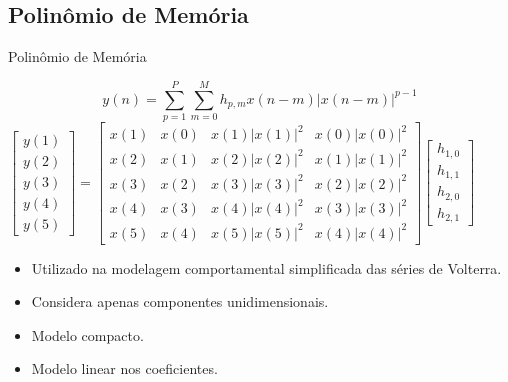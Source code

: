 \documentclass{if-beamer}
\begin{document}
\subsection{Polinômio de Memória}
\begin{frame}{Polinômio de Memória}
	\begin{minipage}{0.6\textwidth}
		\raggedleft
		\scriptsize
		\begin{equation}
			y(n) = \sum_{p=1}^{P} \sum_{m=0}^{M} h_{p,m} x(n-m) |x(n-m)|^{p-1}
		\end{equation}
			$
				\begin{bmatrix}
					y(1) \\
					y(2) \\
					y(3) \\
					y(4) \\
					y(5)
				\end{bmatrix}
				=
				\begin{bmatrix}
					x(1) & x(0) & x(1)\lvert x(1) \rvert ^2 & x(0)\lvert x(0) \rvert^2  \\ 
					x(2) & x(1) & x(2)\lvert x(2) \rvert ^2 & x(1)\lvert x(1) \rvert^2  \\ 
					x(3) & x(2) & x(3)\lvert x(3) \rvert ^2 & x(2)\lvert x(2) \rvert^2 \\ 
					x(4) & x(3) & x(4)\lvert x(4) \rvert ^2 & x(3)\lvert x(3) \rvert^2  \\ 
					x(5) & x(4) & x(5)\lvert x(5) \rvert ^2 & x(4)\lvert x(4) \rvert^2 
				\end{bmatrix}
				\begin{bmatrix}
					h_{1,0} \\
					h_{1,1} \\
					h_{2,0} \\
					h_{2,1}
				\end{bmatrix}
			$
	
			
		
	\end{minipage}%
	\hspace{0.1\textwidth}
	\begin{minipage}{0.4\textwidth}
		\begin{itemize}
			\item Utilizado na modelagem comportamental simplificada das séries de Volterra.
			\item Considera apenas componentes unidimensionais.
			\item Modelo compacto.
			\item Modelo linear nos coeficientes.
		\end{itemize}
	\end{minipage}
\end{frame}
\end{document}
